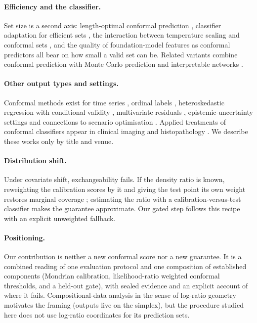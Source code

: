 \documentclass{article}
\begin{document}
\paragraph{Efficiency and the classifier.}
Set size is a second axis: length-optimal conformal prediction \citep{Kiyani2024LengthOI}, classifier adaptation for efficient sets \citep{Liu2024CAdapterAD}, the interaction between temperature scaling and conformal sets \citep{Dabah2024OnTS}, and the quality of foundation-model features as conformal predictors \citep{Fillioux2024AreFM} all bear on how small a valid set can be. Related variants combine conformal prediction with Monte Carlo prediction \citep{Bethell2023RobustUQ} and interpretable networks \citep{Huang2024CONFINECP}.

\paragraph{Other output types and settings.}
Conformal methods exist for time series \citep{Xu2022ConformalPS}, ordinal labels \citep{Chakraborty2024DistributionfreeCP}, heteroskedastic regression with conditional validity \citep{Dewolf2023ConditionalVO}, multivariate residuals \citep{Braun2025MultivariateSR}, epistemic-uncertainty settings \citep{Javanmardi2025OptimalCP} and connections to scenario optimisation \citep{O'Sullivan2025BridgingCP}. Applied treatments of conformal classifiers appear in clinical imaging and histopathology \citep{Cina2026QuantifyingCC,Gelvez2025ConformalPF}. We describe these works only by title and venue.

\paragraph{Distribution shift.}
Under covariate shift, exchangeability fails. If the density ratio is known, reweighting the calibration scores by it and giving the test point its own weight restores marginal coverage \citep{Tibshirani2019Conformal}; estimating the ratio with a calibration-versus-test classifier makes the guarantee approximate. Our gated step follows this recipe with an explicit unweighted fallback.

\paragraph{Positioning.}
Our contribution is neither a new conformal score nor a new guarantee. It is a combined reading of one evaluation protocol and one composition of established components (Mondrian calibration, likelihood-ratio weighted conformal thresholds, and a held-out gate), with sealed evidence and an explicit account of where it fails. Compositional-data analysis in the sense of log-ratio geometry \citep{Aitchison1982Statistical} motivates the framing (outputs live on the simplex), but the procedure studied here does not use log-ratio coordinates for its prediction sets.
\end{document}
